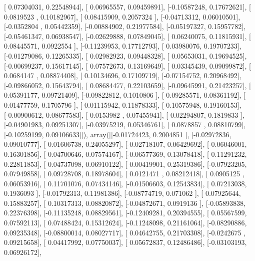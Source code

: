 \documentclass{article}
\begin{document}
       [ 0.07304031,  0.22548944],
       [ 0.06965557,  0.09459891],
       [-0.10587248,  0.17672621],
       [ 0.0819523 ,  0.10182967],
       [ 0.08415909,  0.2057324 ],
       [-0.04713312,  0.06010501],
       [-0.0352804 ,  0.05442359],
       [-0.00884902,  0.21977584],
       [-0.05197327,  0.15957782],
       [-0.05461347,  0.06938547],
       [-0.02629888,  0.07849045],
       [ 0.06240075,  0.11815931],
       [ 0.08445571,  0.0922554 ],
       [-0.11239953,  0.17712793],
       [ 0.03980076,  0.19707233],
       [-0.01279086,  0.12265335],
       [ 0.02982923,  0.09448328],
       [ 0.05653031,  0.19694525],
       [-0.00699237,  0.15617145],
       [ 0.07572673,  0.13169649],
       [ 0.03345439,  0.09099872],
       [ 0.0684147 ,  0.08874408],
       [ 0.10134696,  0.17109719],
       [-0.07154752,  0.20968492],
       [-0.09866052,  0.15643794],
       [ 0.08684477,  0.22103659],
       [-0.09645991,  0.21423257],
       [ 0.05391177,  0.09721409],
       [-0.09822812,  0.1010806 ],
       [ 0.09285571,  0.08361192],
       [ 0.01477759,  0.1705796 ],
       [ 0.01115942,  0.11878333],
       [ 0.10575948,  0.19160153],
       [-0.00900612,  0.08677583],
       [ 0.0153982 ,  0.07455941],
       [ 0.02294807,  0.1819833 ],
       [-0.04901983,  0.09251307],
       [-0.03975219,  0.05346761],
       [ 0.0878857 ,  0.08810799],
       [-0.10259199,  0.09106633]]), array([[-0.01724423,  0.2004851 ],
       [-0.02972836,  0.09010777],
       [ 0.01606738,  0.24055297],
       [-0.02718107,  0.06429692],
       [-0.06046001,  0.16301856],
       [ 0.04700646,  0.07574167],
       [-0.06577369,  0.13078418],
       [ 0.11291232,  0.22811853],
       [ 0.04737098,  0.06910122],
       [ 0.00419901,  0.25319386],
       [-0.07923205,  0.07949858],
       [ 0.09728708,  0.18978604],
       [ 0.0121471 ,  0.08212418],
       [ 0.0905125 ,  0.06053916],
       [ 0.11701076,  0.07434146],
       [-0.01506603,  0.12543834],
       [ 0.07213038,  0.1936093 ],
       [-0.01792313,  0.11981386],
       [-0.08774719,  0.071062  ],
       [ 0.07925644,  0.15883257],
       [ 0.10317313,  0.08820872],
       [-0.04872671,  0.0919136 ],
       [-0.05893838,  0.22376398],
       [-0.11135248,  0.08829561],
       [-0.12409281,  0.20394555],
       [ 0.05567599,  0.07592113],
       [ 0.07488424,  0.15312624],
       [-0.11248098,  0.21161064],
       [-0.08290886,  0.09235348],
       [-0.08800014,  0.08027717],
       [ 0.04642755,  0.21703308],
       [-0.0242675 ,  0.09215658],
       [ 0.04417992,  0.07750037],
       [ 0.05672837,  0.12486486],
       [-0.03103193,  0.06926172],
\end{document}
